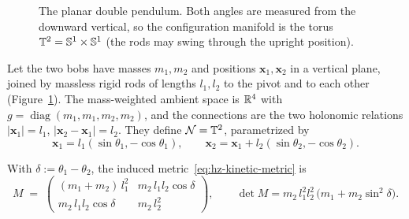 \begin{figure}[t]
\centering
{}
\caption{The planar double pendulum. Both angles are measured from the
downward vertical, so the configuration manifold is the torus
$\mathbb{T}^2=\mathbb{S}^1\times\mathbb{S}^1$ (the rods may swing through the upright position).}
\label{fig:hz-dp}
\end{figure}

Let the two bobs have masses $m_1,m_2$ and positions $\mathbf x_1,\mathbf x_2$
in a vertical plane, joined by massless rigid rods of lengths $l_1,l_2$ to the
pivot and to each other (Figure~\ref{fig:hz-dp}). The mass-weighted ambient
space is $\mathbb{R}^4$ with $g=\operatorname{diag}(m_1,m_1,m_2,m_2)$, and the
connections are the two holonomic relations
$|\mathbf x_1|=l_1$, $|\mathbf x_2-\mathbf x_1|=l_2$. They define
$\mathcal N=\mathbb{T}^2$, parametrized by
\[
  \mathbf x_1=l_1(\sin\theta_1,-\cos\theta_1),\qquad
  \mathbf x_2=\mathbf x_1+l_2(\sin\theta_2,-\cos\theta_2).
\]

\begin{proposition}\label{prop:hz-dp-metric}
With $\delta:=\theta_1-\theta_2$, the induced metric~\eqref{eq:hz-kinetic-metric} is
\[
  M\;=\;\begin{pmatrix}(m_1+m_2)\,l_1^2 & m_2\,l_1l_2\cos\delta\\[2pt]
                       m_2\,l_1l_2\cos\delta & m_2\,l_2^2\end{pmatrix},
  \qquad
  \det M=m_2\,l_1^2l_2^2\,\bigl(m_1+m_2\sin^2\delta\bigr).
\]
\end{proposition}

